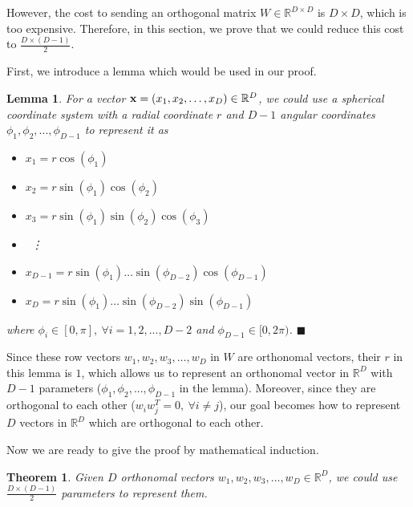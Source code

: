 However, the cost to sending an orthogonal matrix $W\in\mathbb{R}^{D\times D}$ is $D\times D$, which is too expensive.  Therefore, in this section, we prove that we could reduce this cost to $\frac{D\times (D-1)}{2}$.

First, we introduce a lemma which would be used in our proof.

\newtheorem*{lemma}{Lemma}
\begin{lemma}\normalfont
 For a vector $\bold{x}=(x_1,x_2,\ldots,x_D)\in\mathbb{R}^D$, we could use a spherical coordinate system with a radial coordinate $r$ and $D-1$ angular coordinates $\phi_1, \phi_2, ..., \phi_{D-1}$ to represent it as
\begin{itemize}
	\item $x_1 = r \cos(\phi_1)$
	\item $x_2 = r \sin(\phi_1)\cos(\phi_2)$
	\item $x_3 = r \sin(\phi_1)\sin(\phi_2)\cos(\phi_3)$
	\item ~\vdots
	\item $x_{D-1} = r \sin(\phi_1)\ldots \sin(\phi_{D-2})\cos(\phi_{D-1})$
	\item $x_{D} = r \sin(\phi_1)\ldots \sin(\phi_{D-2})\sin(\phi_{D-1})$
\end{itemize}
where $\phi_i\in[0,\pi],~\forall i=1,2,...,D-2$ and $\phi_{D-1}\in[0,2\pi)$. $\blacksquare$
\end{lemma}

Since these row vectors $w_1,w_2,w_3,\ldots,w_D$ in $W$ are orthonomal vectors, their $r$ in this lemma is $1$, which allows us to represent an orthonomal vector in $\mathbb{R}^D$ with $D-1$ parameters ($\phi_1,\phi_2, ...,\phi_{D-1}$ in the lemma).  Moreover, since they are orthogonal to each other ($w_iw_j^T=0,~\forall i\neq j$), our goal becomes how to represent $D$ vectors in $\mathbb{R}^D$ which are orthogonal to each other.

Now we are ready to give the proof by mathematical induction.

\newtheorem*{half}{Theorem}
\begin{half}\normalfont
Given $D$ orthonomal vectors $w_1,w_2,w_3,\ldots,w_D \in \mathbb{R}^D $, we could use $\frac{D\times (D-1)}{2}$ parameters to represent them.
\end{half}

